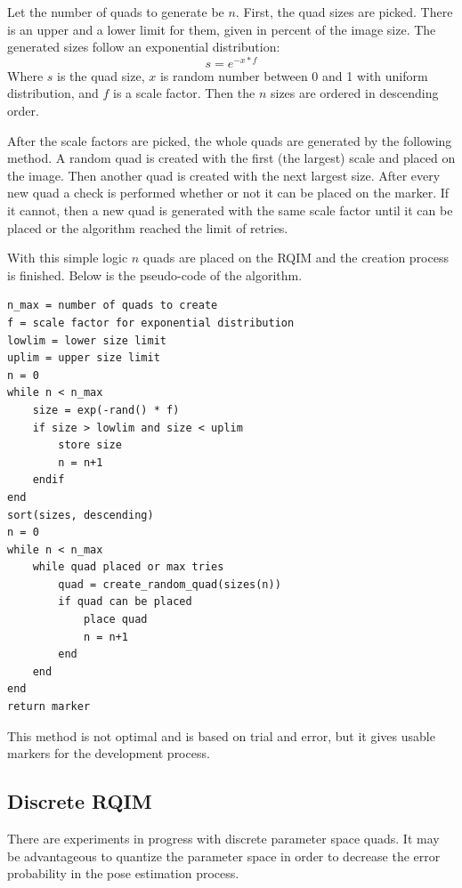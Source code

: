 Let the number of quads to generate be $n$.
First, the quad sizes are picked.
There is an upper and a lower limit for them, given in percent of the image size.
The generated sizes follow an exponential distribution:
\begin{equation}
	s = e^{-x*f}
\end{equation}
Where $s$ is the quad size, $x$ is random number between 0 and 1 with uniform distribution, and $f$ is a scale factor.
Then the $n$ sizes are ordered in descending order.

After the scale factors are picked, the whole quads are generated by the following method.
A random quad is created with the first (the largest) scale and placed on the image.
Then another quad is created with the next largest size.
After every new quad a check is performed whether or not it can be placed on the marker.
If it cannot, then a new quad is generated with the same scale factor until it can be placed or the algorithm reached the limit of retries.

With this simple logic $n$ quads are placed on the RQIM and the creation process is finished.
Below is the pseudo-code of the algorithm.

\begin{lstlisting}
n_max = number of quads to create
f = scale factor for exponential distribution
lowlim = lower size limit
uplim = upper size limit
n = 0
while n < n_max
	size = exp(-rand() * f)
	if size > lowlim and size < uplim
		store size
		n = n+1
	endif
end
sort(sizes, descending)
n = 0
while n < n_max
	while quad placed or max tries
		quad = create_random_quad(sizes(n))
		if quad can be placed
			place quad
			n = n+1
		end
	end
end
return marker
\end{lstlisting}

This method is not optimal and is based on trial and error, but it gives usable markers for the development process.

\subsection{Discrete RQIM}

There are experiments in progress with discrete parameter space quads.
It may be advantageous to quantize the parameter space in order to decrease the error probability in the pose estimation process.


